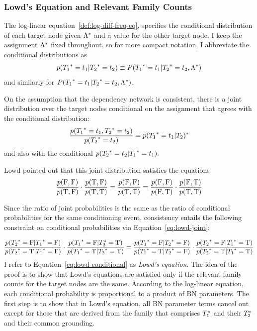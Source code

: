 \documentclass{sfuthesis}
\begin{document}
\begin{appendices}
\subsubsection{Lowd's Equation and Relevant Family Counts}
The log-linear equation~\ref{def:log-diff-freq-eq}, specifies the conditional distribution of each target node given $\Lambda^{*}\hspace{0.0ex}$ and a value for the other target node. I  keep the assignment $\Lambda^{*}\hspace{0.0ex}$ fixed throughout, so for more compact notation, I  abbreviate the conditional distributions as
$$p({T_{1}}^{*}\hspace{0.0ex} = t_{1}| {T_{2}}^{*}\hspace{0.0ex} = t_{2}) \equiv P({T_{1}}^{*}\hspace{0.0ex} = t_{1}|{T_{2}}^{*}\hspace{0.0ex} = t_{2},\Lambda^{*}\hspace{0.0ex})$$ 
and similarly for $P({T_{1}}^{*}\hspace{0.0ex} = t_{1}|{T_{2}}^{*}\hspace{0.0ex} = t_{2},\Lambda^{*}\hspace{0.0ex})$.

On the assumption that the dependency network is consistent, there is a joint distribution over the target nodes conditional on the assignment that agrees with the conditional distribution:
$$\frac{p({T_{1}}^{*}\hspace{0.0ex} = t_{1}, {T_{2}}^{*}\hspace{0.0ex} = t_{2})}{p({T_{2}}^{*}\hspace{0.0ex} = t_{2})}= p({T_{1}}^{*}\hspace{0.0ex} = t_{1}| {T_{2}})^{*}\hspace{0.0ex}$$
and also with the conditional $p({T_{2}}^{*}\hspace{0.0ex} = t_{2}| {T_{1}}^{*}\hspace{0.0ex}=t_{1}).$

Lowd \cite{Lowd2012} pointed out that this joint distribution satisfies the equations
\begin{equation}  \frac{p(\mathrm{F},\mathrm{F})}{p(\mathrm{T},\mathrm{F})} \cdot \frac{p(\mathrm{T},\mathrm{F})}{p(\mathrm{T},\mathrm{T})}= \frac{p(\mathrm{F},\mathrm{F})}{p(\mathrm{T},\mathrm{T})} = \frac{p(\mathrm{F},\mathrm{F})}{p(\mathrm{F},\mathrm{T})} \cdot \frac{p(\mathrm{F},\mathrm{T})}{p(\mathrm{T},\mathrm{T})} \label{eq:lowd-joint}
\end{equation}

Since the ratio of joint probabilities is the same as the ratio of conditional probabilities for the same conditioning event, consistency entails the following constraint on conditional probabilities via Equation~\eqref{eq:lowd-joint}:

{\small
\begin{equation}
\frac{p({T_{2}}^{*}\hspace{0.0ex}=\mathrm{F}|{T_{1}}^{*}\hspace{0.0ex}=\mathrm{F})}{p({T_{2}}^{*}\hspace{0.0ex} = \mathrm{T}| {T_{1}}^{*}\hspace{0.0ex}=\mathrm{F})} \cdot \frac{p({T_{1}}^{*}\hspace{0.0ex}=\mathrm{F}|{T}_{2}^{*}\hspace{0.0ex}=\mathrm{T})}{p({T_{1}}^{*}\hspace{0.0ex} = \mathrm{T}| {T_{2}}^{*}\hspace{0.0ex}=\mathrm{T})} =\frac{p({T_{1}}^{*}\hspace{0.0ex}=\mathrm{F}|{T_{2}}^{*}\hspace{0.0ex}=\mathrm{F})}{p({T_{1}}^{*}\hspace{0.0ex} = \mathrm{T}| {T_{2}}^{*}\hspace{0.0ex}=\mathrm{F})} \cdot \frac{p({T_{2}}^{*}\hspace{0.0ex}=\mathrm{F}|{T_{1}}^{*}\hspace{0.0ex}=\mathrm{T})}{p({T_{2}}^{*}\hspace{0.0ex} = \mathrm{T}| {T_{1}}^{*}\hspace{0.0ex}=\mathrm{T})} \label{eq:lowd-conditional}
\end{equation}
}I  refer to Equation~\ref{eq:lowd-conditional} as {\em Lowd's equation}. 
The idea of the proof is to show that Lowd's equations are satisfied only if the relevant family counts for the target nodes are the same. According to the log-linear equation, each conditional probability is proportional to a product of BN parameters. The first step is to show that in Lowd's equation, all BN parameter terms cancel out except for those that are derived from the family that comprises $T_{1}^{*}\hspace{0.0ex}$ and their $T_{2}^{*}\hspace{0.0ex}$ and their common grounding. 


\end{appendices}
\end{document}
